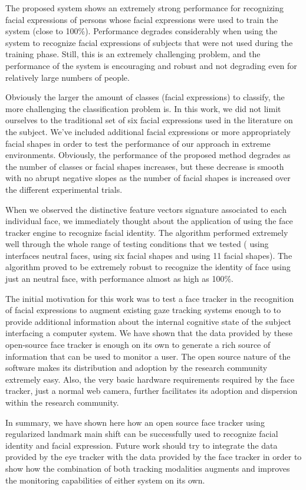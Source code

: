 \documentclass[]{article}
\begin{document}
The proposed system shows an extremely strong performance for recognizing facial expressions of persons whose facial
expressions were used to train the system (close to 100\%). Performance degrades considerably when using the system to
recognize facial expressions of subjects that were not used during the training phase. Still, this is an extremely
challenging problem, and the performance of the system is encouraging and robust and not degrading even for relatively
large numbers of people.


Obviously the larger the amount of classes (facial expressions) to classify, the more challenging the
classification problem is. In this work, we did not limit ourselves to the traditional set  of six facial expressions
used in the literature on the subject. We've included additional facial expressions or more appropriately facial shapes
in order to test the performance of our approach in extreme environments. Obviously, the performance of the proposed
method degrades as the number of classes  or facial shapes increases, but these decrease is smooth with no abrupt
negative slopes as the number of facial shapes is increased over the different experimental trials.


When we observed the distinctive feature vectors signature associated to each individual face, we immediately thought
about the application of using the face tracker engine to recognize facial identity. The algorithm performed extremely
well  through the whole range of testing conditions that we tested ( using interfaces neutral faces, using six facial
shapes and using 11 facial shapes). The algorithm proved to be extremely robust to recognize the identity of face using
just an neutral face, with performance  almost as high as 100\%.

The initial motivation for this work was to test a face tracker in the recognition of facial expressions  to augment
existing gaze tracking systems enough to to provide additional information about the internal cognitive state of the
subject interfacing a computer system. We have shown that the data provided by these open-source face tracker is enough
on its own to generate a rich source of information that can be used to monitor a user. The open source nature of the
software makes its distribution and adoption by the research community extremely easy. Also, the very basic hardware
requirements required by the face tracker, just a normal web camera, further facilitates its adoption and dispersion
within the research community. 


In summary, we have shown here how an open source face tracker using regularized landmark main shift can be successfully
used to recognize facial identity and facial expression. Future work should try to integrate the data provided by the
eye tracker with the data provided by the face tracker in order to show how the combination of both tracking modalities
augments and improves the monitoring capabilities of either system on its own.





\end{document}
